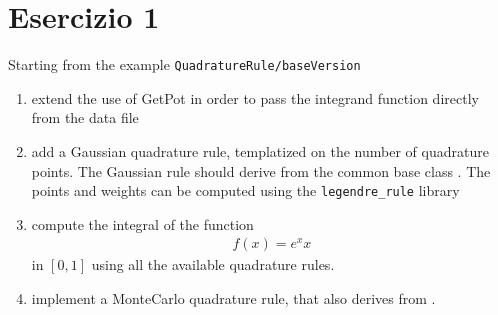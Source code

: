 \section*{Esercizio 1}

Starting from the example \texttt{QuadratureRule/baseVersion}
\begin{enumerate}
  \item extend the use of GetPot in order to pass the integrand function
  directly from the data file

  \item add a Gaussian quadrature rule, templatized on the number of quadrature
  points. The Gaussian rule should derive from the common base class
  . The points and weights can be computed using the
  \texttt{legendre\_rule} library

  \item compute the integral of the function
    \begin{align*}
    f(x) = e^x x
    \end{align*}
  in $[0,1]$ using all the available quadrature rules.

  \item implement a MonteCarlo quadrature rule, that also derives from
  .
\end{enumerate}

